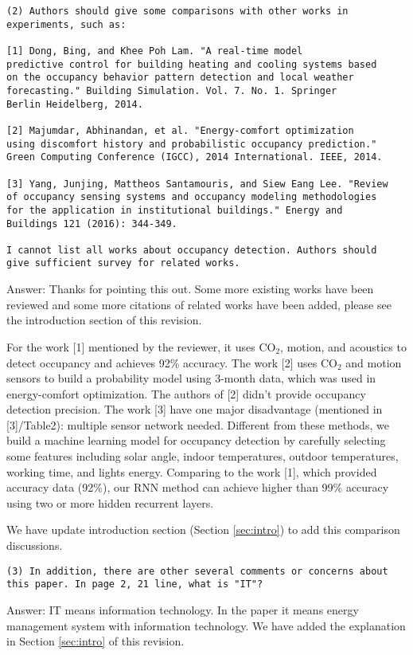 \begin{verbatim}
(2) Authors should give some comparisons with other works in
experiments, such as:

[1] Dong, Bing, and Khee Poh Lam. "A real-time model
predictive control for building heating and cooling systems based
on the occupancy behavior pattern detection and local weather
forecasting." Building Simulation. Vol. 7. No. 1. Springer
Berlin Heidelberg, 2014.

[2] Majumdar, Abhinandan, et al. "Energy-comfort optimization
using discomfort history and probabilistic occupancy prediction."
Green Computing Conference (IGCC), 2014 International. IEEE, 2014.

[3] Yang, Junjing, Mattheos Santamouris, and Siew Eang Lee. "Review
of occupancy sensing systems and occupancy modeling methodologies
for the application in institutional buildings." Energy and
Buildings 121 (2016): 344-349.

I cannot list all works about occupancy detection. Authors should
give sufficient survey for related works.
\end{verbatim}

Answer: Thanks for pointing this out. Some more existing works have
been reviewed and some more citations of related works have been
added, please see the introduction section of this revision.

For the work [1] mentioned by the reviewer, it uses CO$_2$, motion,
and acoustics to detect occupancy and achieves 92\% accuracy. The work
[2] uses CO$_2$ and motion sensors to build a probability model using
3-month data, which was used in energy-comfort optimization. The
authors of [2] didn't provide occupancy detection precision. The work
[3] have one major disadvantage (mentioned in [3]/Table2): multiple
sensor network needed. Different from these methods, we build a
machine learning model for occupancy detection by carefully selecting
some features including solar angle, indoor temperatures, outdoor
temperatures, working time, and lights energy. Comparing to the work
[1], which provided accuracy data (92\%), our RNN method can achieve
higher than 99\% accuracy using two or more hidden recurrent layers.

We have update introduction section (Section \ref{sec:intro}) to add
this comparison discussions.

\begin{verbatim}
(3) In addition, there are other several comments or concerns about
this paper. In page 2, 21 line, what is "IT"?
\end{verbatim}
Answer: IT means information technology. In the paper it means energy
management system with information technology. We have added the explanation in
Section \ref{sec:intro} of this revision.

